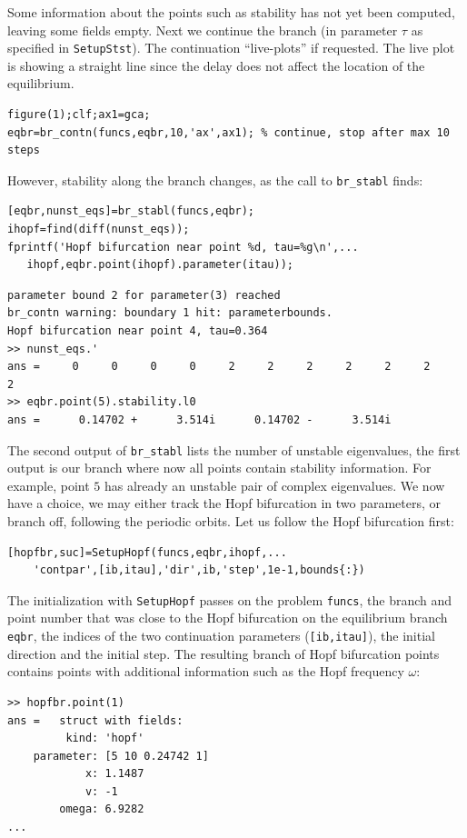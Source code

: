 \documentclass[10pt]{scrartcl}
\newcommand{\blist}[1]{\mbox{\lstinline!#1!}}
\begin{document}
Some information about the points such as stability has not yet been
computed, leaving some fields empty. Next we continue the branch (in
parameter $\tau$ as specified in \blist{SetupStst}). The continuation
``live-plots'' if requested. The live plot is showing a straight
line since the delay does not affect the location of the equilibrium.
\begin{lstlisting}
figure(1);clf;ax1=gca;
eqbr=br_contn(funcs,eqbr,10,'ax',ax1); % continue, stop after max 10 steps
\end{lstlisting}
However, stability along the branch changes, as the call to \blist{br_stabl} finds:
\begin{lstlisting}
[eqbr,nunst_eqs]=br_stabl(funcs,eqbr);
ihopf=find(diff(nunst_eqs));
fprintf('Hopf bifurcation near point %d, tau=%g\n',...
   ihopf,eqbr.point(ihopf).parameter(itau));
\end{lstlisting}
\begin{verbatim}
parameter bound 2 for parameter(3) reached
br_contn warning: boundary 1 hit: parameterbounds.
Hopf bifurcation near point 4, tau=0.364
>> nunst_eqs.'
ans =     0     0     0     0     2     2     2     2     2     2     2
>> eqbr.point(5).stability.l0
ans =      0.14702 +      3.514i      0.14702 -      3.514i
\end{verbatim}
The second output of \blist{br_stabl} lists the number of unstable eigenvalues, the first output is our branch where now all points contain stability information. For example, point $5$ has already an unstable pair of complex eigenvalues. We now have a choice, we may either track the Hopf bifurcation in two parameters, or branch off, following the periodic orbits. Let us follow the Hopf bifurcation first:
\begin{lstlisting}
[hopfbr,suc]=SetupHopf(funcs,eqbr,ihopf,...
    'contpar',[ib,itau],'dir',ib,'step',1e-1,bounds{:})
\end{lstlisting}
The initialization with \blist{SetupHopf} passes on the problem
\blist{funcs}, the branch and point number that was close to the Hopf
bifurcation on the equilibrium branch \blist{eqbr}, the indices of the two
continuation parameters (\blist{[ib,itau]}), the initial direction and
the initial step. The resulting branch of Hopf bifurcation points
contains points with additional information such as the Hopf frequency
$\omega$:
\begin{verbatim}
>> hopfbr.point(1)
ans =   struct with fields:
         kind: 'hopf'
    parameter: [5 10 0.24742 1]
            x: 1.1487
            v: -1
        omega: 6.9282
...
\end{verbatim}
\end{document}
